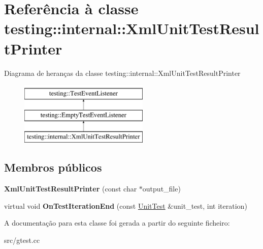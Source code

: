 \hypertarget{classtesting_1_1internal_1_1XmlUnitTestResultPrinter}{\section{Referência à classe testing\-:\-:internal\-:\-:Xml\-Unit\-Test\-Result\-Printer}
\label{classtesting_1_1internal_1_1XmlUnitTestResultPrinter}
}
Diagrama de heranças da classe testing\-:\-:internal\-:\-:Xml\-Unit\-Test\-Result\-Printer\begin{figure}[H]
\begin{center}
\leavevmode
\includegraphics[height=3.000000cm]{classtesting_1_1internal_1_1XmlUnitTestResultPrinter}
\end{center}
\end{figure}
\subsection*{Membros públicos}
\begin{DoxyCompactItemize}
\item 
\hypertarget{classtesting_1_1internal_1_1XmlUnitTestResultPrinter_afdaf88e6764c18ce0dcc3733d7a06e31}{{\bfseries Xml\-Unit\-Test\-Result\-Printer} (const char $\ast$output\-\_\-file)}\label{classtesting_1_1internal_1_1XmlUnitTestResultPrinter_afdaf88e6764c18ce0dcc3733d7a06e31}

\item 
\hypertarget{classtesting_1_1internal_1_1XmlUnitTestResultPrinter_a2ae986dd2f4f2aed31cc6f3bc8c56898}{virtual void {\bfseries On\-Test\-Iteration\-End} (const \hyperlink{classtesting_1_1UnitTest}{Unit\-Test} \&unit\-\_\-test, int iteration)}\label{classtesting_1_1internal_1_1XmlUnitTestResultPrinter_a2ae986dd2f4f2aed31cc6f3bc8c56898}

\end{DoxyCompactItemize}


A documentação para esta classe foi gerada a partir do seguinte ficheiro\-:\begin{DoxyCompactItemize}
\item 
src/gtest.\-cc\end{DoxyCompactItemize}
